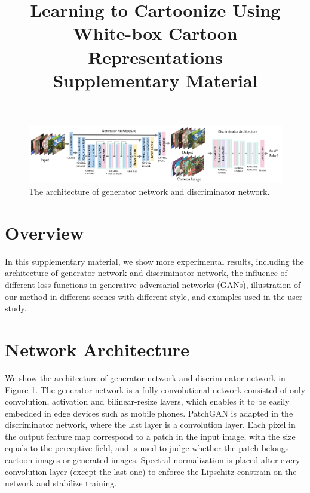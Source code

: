 \documentclass[10pt,twocolumn,letterpaper]{article}
\begin{document}



\title{Learning to Cartoonize Using White-box Cartoon Representations\\Supplementary Material}
\maketitle

\begin{figure}[b]
\centering
\includegraphics[width=\linewidth]{figures/network_architecture.pdf}
\caption{The architecture of generator network and discriminator network.}
\label{fig:network_architecture}
\end{figure}

\section{Overview}
In this supplementary material, we show more experimental results, including the architecture of generator network and discriminator network, the influence of different loss functions in generative adversarial networks (GANs), illustration of our method in different scenes with different style, and examples used in the user study.

\section{Network Architecture}
We show the architecture of generator network and discriminator network in Figure \ref{fig:network_architecture}. The generator network is a fully-convolutional network consisted of only convolution, activation and bilinear-resize layers, which enables it to be easily embedded in edge devices such as mobile phones. PatchGAN \cite{isola2017image} is adapted in the discriminator network, where the last layer is a convolution layer. Each pixel in the output feature map correspond to a patch in the input image, with the size equals to the perceptive field, and is used to judge whether the patch belongs cartoon images or generated images. Spectral normalization \cite{miyato2018spectral} is placed after every convolution layer (except the last one) to enforce the Lipschitz constrain on the network and stabilize training. 
\end{document}
